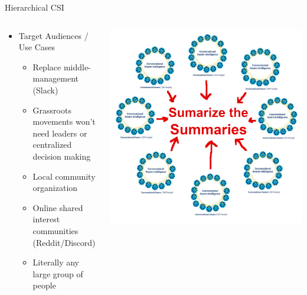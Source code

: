 \documentclass[aspectratio=169]{beamer}
\begin{document}
\begin{frame}{Hierarchical CSI}
\begin{columns}[T]
    \begin{column}[T]{0.5\textwidth}
        \begin{itemize}
            \item Target Audiences / Use Cases
            \begin{itemize}
                \item Replace middle-management (Slack)
                \item Grassroots movements won't need leaders or centralized decision making
                \item Local community organization
                \item Online shared interest communities (Reddit/Discord)
                \item Literally any large group of people
            \end{itemize}
        \end{itemize}
    \end{column}
    \begin{column}{0.5\textwidth}
        \includegraphics[height=0.8\textheight]{imgs/CSI_section/hierarchical_summaries.png}
    \end{column}
\end{columns}
\end{frame}
\end{document}
